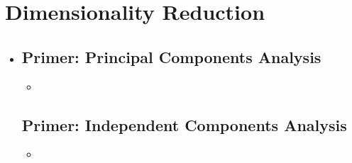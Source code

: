 \section{Dimensionality Reduction}
\begin{itemize}
  \item []
  
  \subsection{Primer: Principal Components Analysis}
  \begin{itemize}
    \item []
  \end{itemize}
    
  \subsection{Primer: Independent Components Analysis}
  \begin{itemize}
    \item 
  \end{itemize}
    
\end{itemize}

